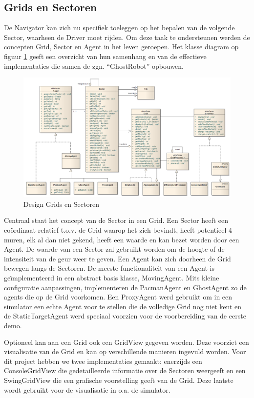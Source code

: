 \documentclass[12pt,a4paper]{report}
\begin{document}
\subsection{Grids en Sectoren}

De Navigator kan zich nu specifiek toeleggen op het bepalen van de volgende Sector, waarheen de Driver moet rijden. Om deze taak te ondersteunen werden de concepten Grid, Sector en Agent in het leven geroepen. Het klasse diagram op figuur \ref{uml:grids-sectoren} geeft een overzicht van hun samenhang en van de effectieve implementaties die samen de zgn. ``GhostRobot'' opbouwen.

\begin{figure}[htbp]
  \centering
  \includegraphics[width=200mm, angle=90]{resources/grids-sectors.png}
  \caption{Design Grids en Sectoren}
  \label{uml:grids-sectoren}
\end{figure}

Centraal staat het concept van de Sector in een Grid. Een Sector heeft een co\"ordinaat relatief t.o.v. de Grid waarop het zich bevindt, heeft potentieel 4 muren, elk al dan niet gekend, heeft een waarde en kan bezet worden door een Agent. De waarde van een Sector zal gebruikt worden om de hoogte of de intensiteit van de geur weer te geven. Een Agent kan zich doorheen de Grid bewegen langs de Sectoren. De meeste functionaliteit van een Agent is ge\"implementeerd in een abstract basis klasse, MovingAgent. Mits kleine configuratie aanpassingen, implementeren de PacmanAgent en GhostAgent zo de agents die op de Grid voorkomen. Een ProxyAgent werd gebruikt om in een simulator een echte Agent voor te stellen die de volledige Grid nog niet kent en de StaticTargetAgent werd speciaal voorzien voor de voorbereiding van de eerste demo.

Optioneel kan aan een Grid ook een GridView gegeven worden. Deze voorziet een visualisatie van de Grid en kan op verschillende manieren ingevuld worden. Voor dit project hebben we twee implementaties gemaakt: enerzijds een ConsoleGridView die gedetailleerde informatie over de Sectoren weergeeft en een SwingGridView die een grafische voorstelling geeft van de Grid. Deze laatste wordt gebruikt voor de visualisatie in o.a. de simulator.
\end{document}

